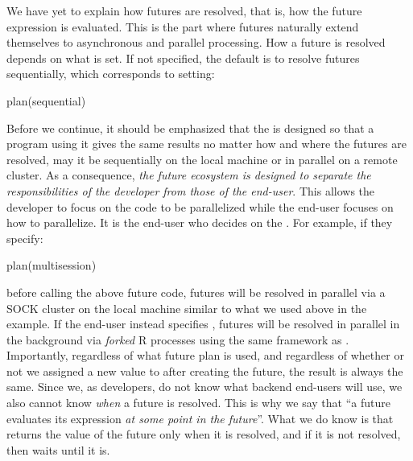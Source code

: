 We have yet to explain how futures are resolved, that is, how the
future expression is evaluated.  This is the part where futures
naturally extend themselves to asynchronous and parallel processing.
How a future is resolved depends on what  is set.
If not specified, the default is to resolve futures sequentially,
which corresponds to setting:
\begin{example}
plan(sequential)
\end{example}
Before we continue, it should be emphasized that the 
is designed so that a program using it gives the same results no
matter how and where the futures are resolved, may it be sequentially
on the local machine or in parallel on a remote cluster.  As a
consequence, \emph{the future ecosystem is designed to separate the
responsibilities of the developer from those of the end-user}.  This
allows the developer to focus on the code to be parallelized while the
end-user focuses on how to parallelize.  It is the end-user who
decides on the .  For example, if they specify:
\begin{example}
plan(multisession)
\end{example}
before calling the above future code, futures will be resolved in
parallel via a SOCK cluster on the local machine similar to what we
used above in the  example.  If the end-user instead
specifies , futures will be resolved in parallel
in the background via \emph{forked} R processes using the same
framework as .  Importantly, regardless of what
future plan is used, and regardless of whether or not we assigned a
new value to  after creating the future, the result is always
the same.  Since we, as developers, do not know what backend end-users
will use, we also cannot know \emph{when} a future is resolved.  This
is why we say that ``a future evaluates its expression \emph{at some
point in the future}''.  What we do know is that 
returns the value of the future only when it is resolved, and if it is
not resolved, then  waits until it is.

